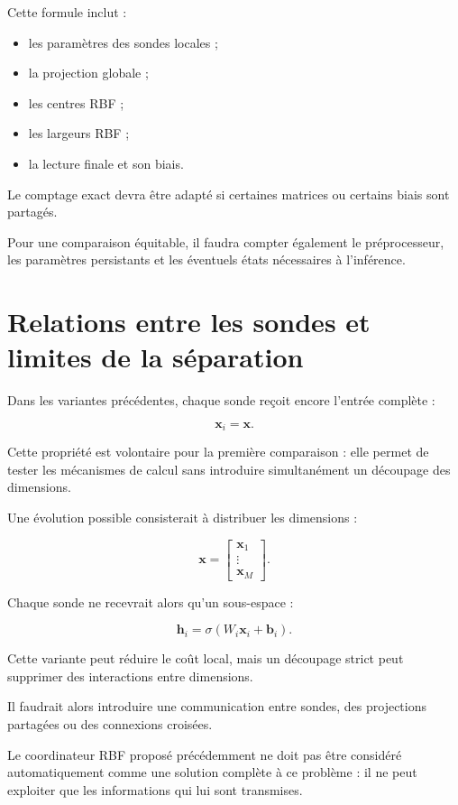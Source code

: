 \documentclass[11pt,a4paper]{article}
\begin{document}
Cette formule inclut :
\begin{itemize}
  \item les paramètres des sondes locales ;
  \item la projection globale ;
  \item les centres RBF ;
  \item les largeurs RBF ;
  \item la lecture finale et son biais.
\end{itemize}

Le comptage exact devra être adapté si certaines matrices
ou certains biais sont partagés.

Pour une comparaison équitable, il faudra compter également
le préprocesseur, les paramètres persistants et les éventuels
états nécessaires à l'inférence.

\section{Relations entre les sondes et limites de la séparation}

Dans les variantes précédentes, chaque sonde reçoit encore
l'entrée complète :

\[
  \bm{x}_i=\bm{x}.
\]

Cette propriété est volontaire pour la première comparaison :
elle permet de tester les mécanismes de calcul sans introduire
simultanément un découpage des dimensions.

Une évolution possible consisterait à distribuer les dimensions :

\[
  \bm{x}
  =
  \begin{bmatrix}
  \bm{x}_1\\
  \vdots\\
  \bm{x}_M
  \end{bmatrix}.
\]

Chaque sonde ne recevrait alors qu'un sous-espace :

\[
  \bm{h}_i
  =
  \sigma(W_i\bm{x}_i+\bm{b}_i).
\]

Cette variante peut réduire le coût local, mais un découpage
strict peut supprimer des interactions entre dimensions.

Il faudrait alors introduire une communication entre sondes,
des projections partagées ou des connexions croisées.

Le coordinateur RBF proposé précédemment ne doit pas être
considéré automatiquement comme une solution complète
à ce problème : il ne peut exploiter que les informations
qui lui sont transmises.
\end{document}
